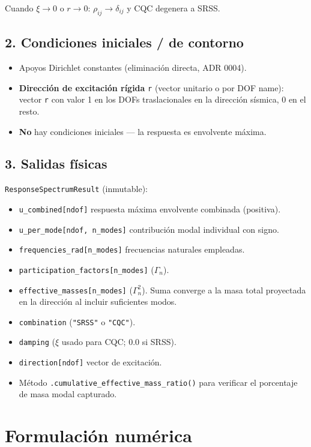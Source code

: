 \documentclass[11pt,letterpaper,oneside]{report}
\begin{document}
Cuando $\xi \to 0$ o $r \to 0$: $\rho_{ij} \to \delta_{ij}$ y CQC degenera a SRSS.

\subsection{2. Condiciones iniciales / de contorno}

\begin{itemize}
  \item Apoyos Dirichlet constantes (eliminación directa, ADR 0004).
  \item \textbf{Dirección de excitación rígida} \texttt{r} (vector unitario o por DOF name): vector \texttt{r} con valor 1 en los DOFs traslacionales en la dirección sísmica, 0 en el resto.
  \item \textbf{No} hay condiciones iniciales --- la respuesta es envolvente máxima.
\end{itemize}

\subsection{3. Salidas físicas}

\texttt{ResponseSpectrumResult} (inmutable):

\begin{itemize}
  \item \texttt{u\_combined[ndof]} respuesta máxima envolvente combinada (positiva).
  \item \texttt{u\_per\_mode[ndof, n\_modes]} contribución modal individual con signo.
  \item \texttt{frequencies\_rad[n\_modes]} frecuencias naturales empleadas.
  \item \texttt{participation\_factors[n\_modes]} ($\Gamma_n$).
  \item \texttt{effective\_masses[n\_modes]} ($\Gamma_n^2$). Suma converge a la masa total proyectada en la dirección al incluir suficientes modos.
  \item \texttt{combination} (\texttt{"SRSS"} o \texttt{"CQC"}).
  \item \texttt{damping} (\ensuremath{\xi} usado para CQC; 0.0 si SRSS).
  \item \texttt{direction[ndof]} vector de excitación.
  \item Método \texttt{.cumulative\_effective\_mass\_ratio()} para verificar el porcentaje de masa modal capturado.
\end{itemize}


\section{Formulación numérica}
\end{document}
